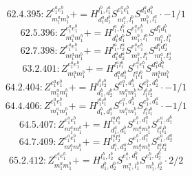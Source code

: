 \documentclass[letterpaper,10pt,fleqn,leqno,onecolumn]{article}
\begin{document}
\begin{equation} \;\;\;\;\;\;  62.4.395: Z^{e_{1}^{a}e_{1}^{b}}_{m_{1}^{a}m_{1}^{b}}+=H^{l_{1}^{b},l_{1}^{a}}_{d_{1}^{a}d_{1}^{b}}S^{e_{1}^{a}e_{1}^{b}}_{m_{1}^{a},l_{1}^{b}}S^{d_{1}^{a}d_{1}^{b}}_{m_{1}^{b},l_{1}^{a}}\cdot -1/1 \end{equation}
\begin{equation} \;\;\;\;\;\;  62.5.396: Z^{e_{1}^{a}e_{1}^{b}}_{m_{1}^{a}m_{1}^{b}}+=H^{l_{1}^{a},l_{1}^{b}}_{d_{1}^{a}d_{1}^{b}}S^{e_{1}^{a}e_{1}^{b}}_{m_{1}^{b},l_{1}^{a}}S^{d_{1}^{a}d_{1}^{b}}_{m_{1}^{a},l_{1}^{b}} \end{equation}
\begin{equation} \;\;\;\;\;\;  62.7.398: Z^{e_{1}^{a}e_{1}^{b}}_{m_{1}^{a}m_{1}^{b}}+=H^{l_{1}^{a},l_{2}^{a}}_{d_{1}^{a}d_{2}^{a}}S^{e_{1}^{a}e_{1}^{b}}_{m_{1}^{b},l_{1}^{a}}S^{d_{1}^{a}d_{2}^{a}}_{m_{1}^{a},l_{2}^{a}} \end{equation}
\begin{equation} \;\;\;\;\;\;  63.2.401: Z^{e_{1}^{a}e_{1}^{b}}_{m_{1}^{a}m_{1}^{b}}+=H^{l_{1}^{a}l_{1}^{b}}_{d_{1}^{a}d_{1}^{b}}S^{e_{1}^{a}e_{1}^{b}}_{l_{1}^{a}l_{1}^{b}}S^{d_{1}^{a}d_{1}^{b}}_{m_{1}^{a}m_{1}^{b}} \end{equation}
\begin{equation} \;\;\;\;\;\;  64.2.404: Z^{e_{1}^{a}e_{1}^{b}}_{m_{1}^{a}m_{1}^{b}}+=H^{l_{1}^{b}l_{2}^{b}}_{d_{1}^{b},d_{2}^{b}}S^{e_{1}^{a},d_{1}^{b}}_{m_{1}^{a}m_{1}^{b}}S^{e_{1}^{b},d_{2}^{b}}_{l_{1}^{b}l_{2}^{b}}\cdot -1/1 \end{equation}
\begin{equation} \;\;\;\;\;\;  64.4.406: Z^{e_{1}^{a}e_{1}^{b}}_{m_{1}^{a}m_{1}^{b}}+=H^{l_{1}^{a}l_{1}^{b}}_{d_{1}^{b},d_{1}^{a}}S^{e_{1}^{a},d_{1}^{b}}_{m_{1}^{a}m_{1}^{b}}S^{e_{1}^{b},d_{1}^{a}}_{l_{1}^{a}l_{1}^{b}}\cdot -1/1 \end{equation}
\begin{equation} \;\;\;\;\;\;  64.5.407: Z^{e_{1}^{a}e_{1}^{b}}_{m_{1}^{a}m_{1}^{b}}+=H^{l_{1}^{a}l_{1}^{b}}_{d_{1}^{a},d_{1}^{b}}S^{e_{1}^{b},d_{1}^{a}}_{m_{1}^{a}m_{1}^{b}}S^{e_{1}^{a},d_{1}^{b}}_{l_{1}^{a}l_{1}^{b}} \end{equation}
\begin{equation} \;\;\;\;\;\;  64.7.409: Z^{e_{1}^{a}e_{1}^{b}}_{m_{1}^{a}m_{1}^{b}}+=H^{l_{1}^{a}l_{2}^{a}}_{d_{1}^{a},d_{2}^{a}}S^{e_{1}^{b},d_{1}^{a}}_{m_{1}^{a}m_{1}^{b}}S^{e_{1}^{a},d_{2}^{a}}_{l_{1}^{a}l_{2}^{a}} \end{equation}
\begin{equation} \;\;\;\;\;\;  65.2.412: Z^{e_{1}^{a}e_{1}^{b}}_{m_{1}^{a}m_{1}^{b}}+=H^{l_{1}^{b},l_{2}^{b}}_{d_{1}^{b},d_{2}^{b}}S^{e_{1}^{a},d_{1}^{b}}_{m_{1}^{a},l_{1}^{b}}S^{e_{1}^{b},d_{2}^{b}}_{m_{1}^{b},l_{2}^{b}}\cdot 2/2 \end{equation}
\end{document}
